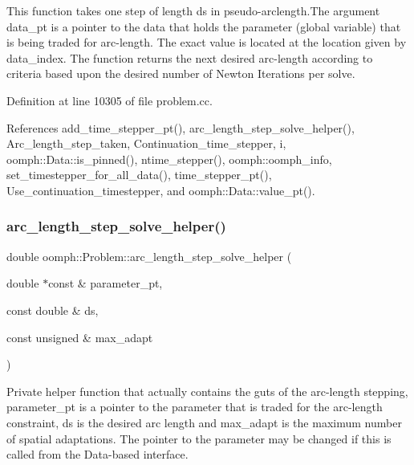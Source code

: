 This function takes one step of length ds in pseudo-\/arclength.\+The argument data\+\_\+pt is a pointer to the data that holds the parameter (global variable) that is being traded for arc-\/length. The exact value is located at the location given by data\+\_\+index. The function returns the next desired arc-\/length according to criteria based upon the desired number of Newton Iterations per solve. 

Definition at line 10305 of file problem.\+cc.



References add\+\_\+time\+\_\+stepper\+\_\+pt(), arc\+\_\+length\+\_\+step\+\_\+solve\+\_\+helper(), Arc\+\_\+length\+\_\+step\+\_\+taken, Continuation\+\_\+time\+\_\+stepper, i, oomph\+::\+Data\+::is\+\_\+pinned(), ntime\+\_\+stepper(), oomph\+::oomph\+\_\+info, set\+\_\+timestepper\+\_\+for\+\_\+all\+\_\+data(), time\+\_\+stepper\+\_\+pt(), Use\+\_\+continuation\+\_\+timestepper, and oomph\+::\+Data\+::value\+\_\+pt().

\mbox{\label{classoomph_1_1Problem_afaa9689a9c73bb76caea5d24980e6788}} 
\subsubsection{\texorpdfstring{arc\+\_\+length\+\_\+step\+\_\+solve\+\_\+helper()}{arc\_length\_step\_solve\_helper()}}
{\footnotesize\ttfamily double oomph\+::\+Problem\+::arc\+\_\+length\+\_\+step\+\_\+solve\+\_\+helper (\begin{DoxyParamCaption}\item[{double $\ast$const \&}]{parameter\+\_\+pt,  }\item[{const double \&}]{ds,  }\item[{const unsigned \&}]{max\+\_\+adapt }\end{DoxyParamCaption})\hspace{0.3cm}{\ttfamily [private]}}



Private helper function that actually contains the guts of the arc-\/length stepping, parameter\+\_\+pt is a pointer to the parameter that is traded for the arc-\/length constraint, ds is the desired arc length and max\+\_\+adapt is the maximum number of spatial adaptations. The pointer to the parameter may be changed if this is called from the Data-\/based interface. 

